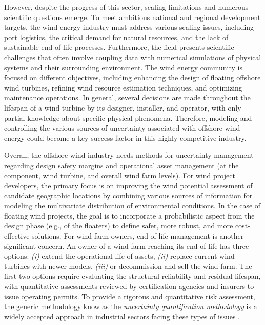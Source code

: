 However, despite the progress of this sector, scaling limitations and numerous scientific questions emerge. 
To meet ambitious national and regional development targets, the wind energy industry must address various scaling issues, including port logistics, the critical demand for natural resources, and the lack of sustainable end-of-life processes. 
Furthermore, the field presents scientific challenges that often involve coupling data with numerical simulations of physical systems and their surrounding environment. 
The wind energy community is focused on different objectives, including enhancing the design of floating offshore wind turbines, refining wind resource estimation techniques, and optimizing maintenance operations. 
In general, several decisions are made throughout the lifespan of a wind turbine by its designer, installer, and operator, with only partial knowledge about specific physical phenomena. 
Therefore, modeling and controlling the various sources of uncertainty associated with offshore wind energy could become a key success factor in this highly competitive industry.

Overall, the offshore wind industry needs methods for uncertainty management \citep{OWT_review_2016} regarding design safety margins and operational asset management (at the component, wind turbine, and overall wind farm levels). 
For wind project developers, the primary focus is on improving the wind potential assessment of candidate geographic locations by combining various sources of information for modeling the multivariate distribution of environmental conditions. 
In the case of floating wind projects, the goal is to incorporate a probabilistic aspect from the design phase (e.g., of the floaters) to define safer, more robust, and more cost-effective solutions.
For wind farm owners, end-of-life management is another significant concern. 
An owner of a wind farm reaching its end of life has three options: \textit{(i)} extend the operational life of assets, \textit{(ii)} replace current wind turbines with newer models, \textit{(iii)} or decommission and sell the wind farm. 
The first two options require evaluating the structural reliability and residual lifespan, with quantitative assessments reviewed by certification agencies and insurers to issue operating permits. 
To provide a rigorous and quantitative risk assessment, the generic methodology know as the \textit{uncertainty quantification methodology} is a widely accepted approach in industrial sectors facing these types of issues \citep{rocquigny_2008,blanchard_2023}.



